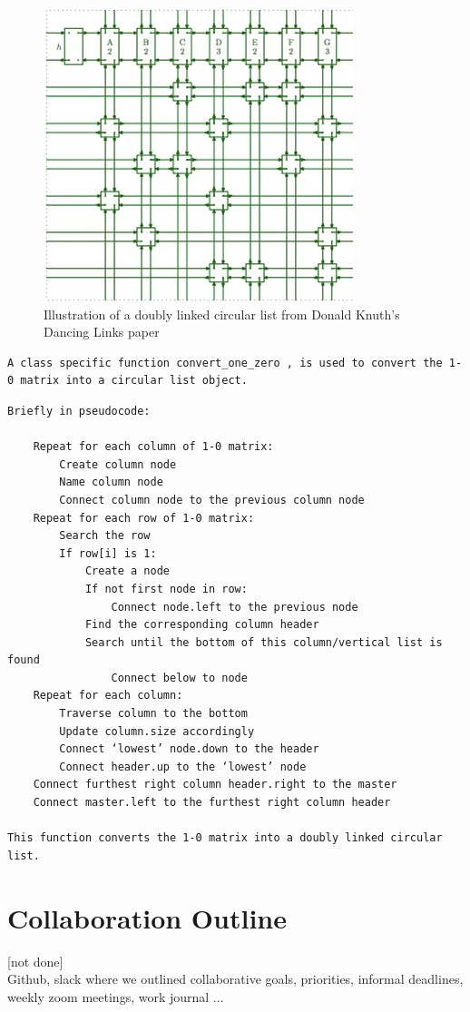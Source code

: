 \documentclass{article}
\begin{document}
 \begin{figure}[ht]
\centering
\includegraphics[scale=0.7]{images/chess4.png}
\caption{Illustration of a doubly linked circular list from Donald Knuth's Dancing Links paper}
\label{fig: Illustration of a doubly linked circular list from Donald Knuth's Dancing Links paper}
\end{figure}


\begin{verbatim}
A class specific function convert_one_zero , is used to convert the 1-0 matrix into a circular list object.
\end{verbatim}
\begin{verbatim}
Briefly in pseudocode:

	Repeat for each column of 1-0 matrix:
		Create column node
		Name column node
		Connect column node to the previous column node
	Repeat for each row of 1-0 matrix:
		Search the row
		If row[i] is 1:
			Create a node
			If not first node in row:
				Connect node.left to the previous node
			Find the corresponding column header
			Search until the bottom of this column/vertical list is found
				Connect below to node
	Repeat for each column:
		Traverse column to the bottom
		Update column.size accordingly
		Connect ‘lowest’ node.down to the header
		Connect header.up to the ‘lowest’ node	
	Connect furthest right column header.right to the master
	Connect master.left to the furthest right column header

This function converts the 1-0 matrix into a doubly linked circular list.
\end{verbatim}

\clearpage
\section{Collaboration Outline}
[not done]\\
Github, 
slack where we outlined collaborative goals, priorities, informal deadlines, 
weekly zoom meetings, 
work journal
...
\clearpage
\end{document}
